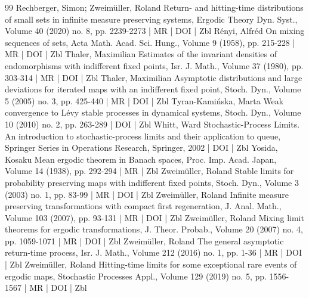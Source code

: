 \begin{thebibliography}{99}
Rechberger, Simon; Zweimüller, Roland Return- and hitting-time distributions of small sets in infinite measure preserving systems, Ergodic Theory Dyn. Syst., Volume 40 (2020) no. 8, pp. 2239-2273 | MR | DOI | Zbl
Rényi, Alfréd On mixing sequences of sets, Acta Math. Acad. Sci. Hung., Volume 9 (1958), pp. 215-228 | MR | DOI | Zbl
Thaler, Maximilian Estimates of the invariant densities of endomorphisms with indifferent fixed points, Isr. J. Math., Volume 37 (1980), pp. 303-314 | MR | DOI | Zbl
Thaler, Maximilian Asymptotic distributions and large deviations for iterated maps with an indifferent fixed point, Stoch. Dyn., Volume 5 (2005) no. 3, pp. 425-440 | MR | DOI | Zbl
Tyran-Kamińska, Marta Weak convergence to Lévy stable processes in dynamical systems, Stoch. Dyn., Volume 10 (2010) no. 2, pp. 263-289 | DOI | Zbl
Whitt, Ward Stochastic-Process Limits. An introduction to stochastic-process limits and their application to queue, Springer Series in Operations Research, Springer, 2002 | DOI | Zbl
Yosida, Kosaku Mean ergodic theorem in Banach spaces, Proc. Imp. Acad. Japan, Volume 14 (1938), pp. 292-294 | MR | Zbl
Zweimüller, Roland Stable limits for probability preserving maps with indifferent fixed points, Stoch. Dyn., Volume 3 (2003) no. 1, pp. 83-99 | MR | DOI | Zbl
Zweimüller, Roland Infinite measure preserving transformations with compact first regeneration, J. Anal. Math., Volume 103 (2007), pp. 93-131 | MR | DOI | Zbl
Zweimüller, Roland Mixing limit theorems for ergodic transformations, J. Theor. Probab., Volume 20 (2007) no. 4, pp. 1059-1071 | MR | DOI | Zbl
Zweimüller, Roland The general asymptotic return-time process, Isr. J. Math., Volume 212 (2016) no. 1, pp. 1-36 | MR | DOI | Zbl
Zweimüller, Roland Hitting-time limits for some exceptional rare events of ergodic maps, Stochastic Processes Appl., Volume 129 (2019) no. 5, pp. 1556-1567 | MR | DOI | Zbl
\end{thebibliography}
